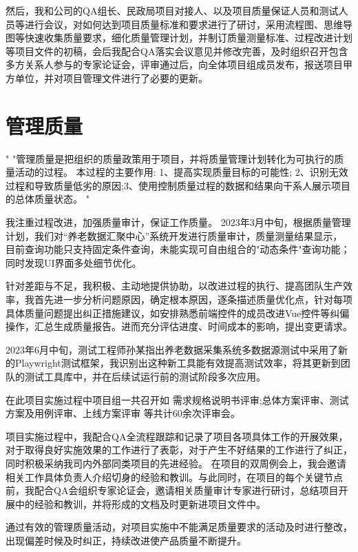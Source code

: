 \documentclass[UTF8]{../computerUniverse}
\begin{document}
然后，我和公司的QA组长、民政局项目对接人、以及项目质量保证人员和测试人员等进行会议，对如何达到项目质量标准和要求进行了研讨，采用流程图、思维导图等快速收集质量要求，细化质量管理计划，并制订质量测量标准、过程改进计划等项目文件的初稿，会后我配合QA落实会议意见并修改完善，及时组织召开包含多方关系人参与的专家论证会，评审通过后，向全体项目组成员发布，报送项目甲方单位，并对项目管理文件进行了必要的更新。


\section{管理质量}

"
"管理质量是把组织的质量政策用于项目，并将质量管理计划转化为可执行的质量活动的过程。
本过程的主要作用:
1、提高实现质量目标的可能性;
2、识别无效过程和导致质量低劣的原因;3、使用控制质量过程的数据和结果向干系人展示项目的总体质量状态。
"

我注重过程改进，加强质量审计，保证工作质量。
2023年3月中旬，根据质量管理计划，我们对“养老数据汇聚中心”系统开发进行质量审计，质量测量结果显示，
目前查询功能只支持固定条件查询，未能实现可自由组合的"动态条件"查询功能；同时发现UI界面多处细节优化。

针对差距与不足，我积极、主动地提供协助，以改进过程的执行、提高团队生产效率，我首先进一步分析问题原因，确定根本原因，逐条描述质量优化点，针对每项具体质量问题提出纠正措施建议，如安排熟悉前端控件的成员改进Vue控件等纠偏操作，汇总生成质量报告。进而充分评估进度、时间成本的影响，提出变更请求。

2023年6月中旬，测试工程师孙某指出养老数据采集系统多数据源测试中采用了新的Playwright测试框架，我识别出这种新工具能有效提高测试效率，将其更新到团队的测试工具库中，并在后续试运行前的测试阶段多次应用。

在此项目实施过程中项目组一共召开如
需求规格说明书评审;总体方案评审、测试方案及用例评审、上线方案评审
等共计60余次评审会。

项目实施过程中，我配合QA全流程跟踪和记录了项目各项具体工作的开展效果，对于取得良好实施效果的工作进行了表彰，对于产生不好结果的工作进行了纠正，同时积极采纳我司内外部同类项目的先进经验。
在项目的双周例会上，我会邀请相关工作具体负责人介绍切身的经验和教训。与此同时，在项目的每个关键节点前，我配合QA会组织专家论证会，邀请相关质量审计专家进行研讨，总结项目开展中的经验和教训，并将形成的文档及时更新进项目文件中。

通过有效的管理质量活动，对项目实施中不能满足质量要求的活动及时进行整改，出现偏差时候及时纠正，持续改进使产品质量不断提升。
\end{document}

